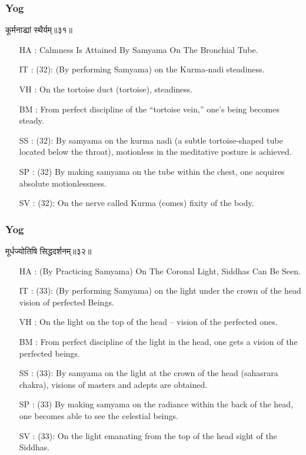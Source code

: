 \begin{frame}[fragile]\frametitle{Yog}
\begin{sanskrit}
कूर्मनाड्यां स्थैर्यम्॥३१॥
\end{sanskrit}

	\begin{itemize}
	\item [HA]: Calmness Is Attained By Samyama On The Bronchial Tube.
	\item [IT]: (32): (By performing Samyama) on the Kurma-nadi steadiness.
	\item [VH]: On the tortoise duct (tortoise), steadiness.
	\item [BM]: From perfect discipline of the “tortoise vein,” one’s being becomes steady.
	\item [SS]: (32): By samyama on the kurma nadi (a subtle tortoise-shaped tube located below the throat), motionless in the meditative posture is achieved.
	\item [SP]: (32) By making samyama on the tube within the chest, one acquires absolute motionlessness.
	\item [SV]: (32): On the nerve called Kurma (comes) fixity of the body. 
	\end{itemize}
\end{frame}


\begin{frame}[fragile]\frametitle{Yog}
\begin{sanskrit}
मूर्धज्योतिषि सिद्धदर्शनम्॥३२॥
\end{sanskrit}

	\begin{itemize}
	\item [HA]: (By Practicing Samyama) On The Coronal Light, Siddhas Can Be Seen.
	\item [IT]: (33): (By performing Samyama) on the light under the crown of the head vision of perfected Beings.
	\item [VH]: On the light on the top of the head – vision of the perfected ones.
	\item [BM]: From perfect discipline of the light in the head, one gets a vision of the perfected beings.
	\item [SS]: (33): By samyama on the light at the crown of the head (sahasrara chakra), visions of masters and adepts are obtained.
	\item [SP]: (33) By making samyama on the radiance within the back of the head, one becomes able to see the celestial beings.
	\item [SV]: (33): On the light emanating from the top of the head sight of the Siddhas. 
	\end{itemize}
\end{frame}

